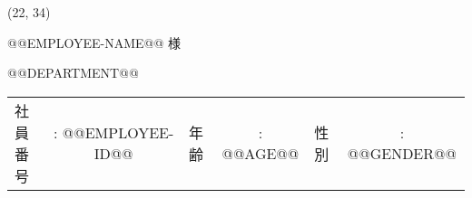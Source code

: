 \documentclass[xelatex, ja=standard]{bxjsarticle}
\begin{document}
	
	\begin{textblock*}{95mm}(22, 34)
		
		\begin{minipage}{\textwidth}
			
			\Large @@EMPLOYEE-NAME@@ 様
			
			\vspace{4mm}
			
			\large @@DEPARTMENT@@
			
			\vspace{10mm}
			
			{\small
				\begin{tabular}{lclclc}
					社員番号 &: @@EMPLOYEE-ID@@ &
					年齢 &: @@AGE@@ &
					性別 &: @@GENDER@@
				\end{tabular}
			} %
			
		\end{minipage}
		
	\end{textblock*}
	
\end{document}
